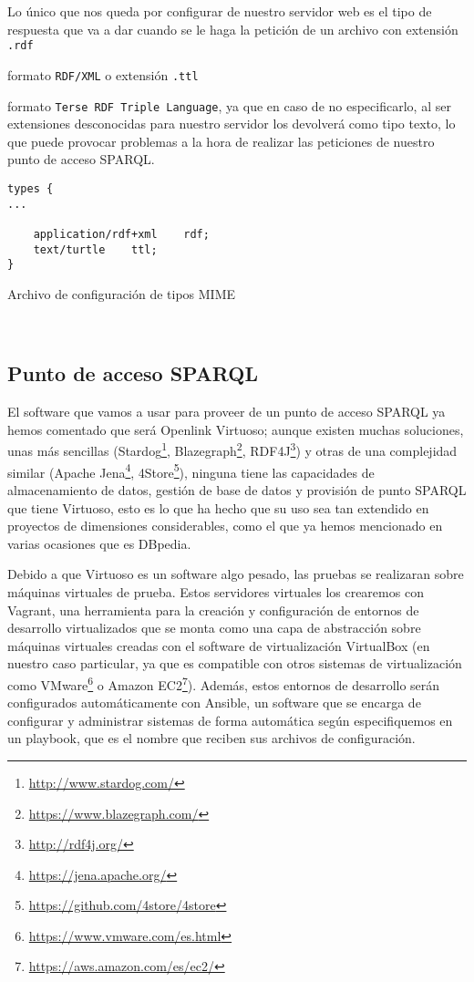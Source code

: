 Lo único que nos queda por configurar de nuestro servidor web es el tipo de respuesta que va a dar cuando se le haga la petición de un archivo con extensión {\tt .rdf} {formato {\tt RDF/XML} o extensión {\tt .ttl} {formato {\tt Terse RDF Triple Language}, ya que en caso de no especificarlo, al ser extensiones desconocidas para nuestro servidor los devolverá como tipo texto, lo que puede provocar problemas a la hora de realizar las peticiones de nuestro punto de acceso {\sf SPARQL}.

\bigskip
\begin{listing}[!ht]
\begin{verbatim}
types {
...

    application/rdf+xml    rdf;
    text/turtle    ttl;
}
\end{verbatim}
\caption{Archivo de configuración de tipos {\sf MIME}}
\end{listing}

\newpage
\
\newpage
\subsection{Punto de acceso SPARQL}

El software que vamos a usar para proveer de un punto de acceso {\sf SPARQL} ya hemos comentado que será {\sf Openlink Virtuoso}; aunque existen muchas soluciones, unas más sencillas ({\sf Stardog}\footnote{\url{http://www.stardog.com/}}, {\sf Blazegraph}\footnote{\url{https://www.blazegraph.com/}}, {\sf RDF4J}{\footnote{\url{http://rdf4j.org/}}}) y otras de una complejidad similar ({\sf Apache Jena}{\footnote{\url{https://jena.apache.org/}}}, {\sf 4Store}\footnote{\url{https://github.com/4store/4store}}), ninguna tiene las capacidades de almacenamiento de datos, gestión de base de datos y provisión de punto {\sf SPARQL} que tiene Virtuoso, esto es lo que ha hecho que su uso sea tan extendido en proyectos de dimensiones considerables, como el que ya hemos mencionado en varias ocasiones que es {\sf DBpedia}.

\bigskip
Debido a que Virtuoso es un software algo pesado, las pruebas se realizaran sobre máquinas virtuales de prueba. Estos servidores virtuales los crearemos con {\sf Vagrant}, una herramienta para la creación y configuración de entornos de desarrollo virtualizados que se monta como una capa de abstracción sobre máquinas virtuales creadas con el software de virtualización {\sf VirtualBox} (en nuestro caso particular, ya que es compatible con otros sistemas de virtualización como {\sf VMware\footnote{\url{https://www.vmware.com/es.html}}} o {\sf Amazon EC2\footnote{\url{https://aws.amazon.com/es/ec2/}}}). Además, estos entornos de desarrollo serán configurados automáticamente con {\sf Ansible}, un software que se encarga de configurar y administrar sistemas de forma automática según especifiquemos en un {\sf playbook}, que es el nombre que reciben sus archivos de configuración.

}}
